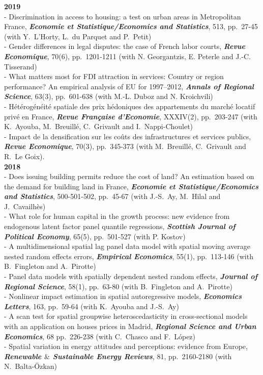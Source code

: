 \documentclass[a4paper,12pt]{article}
\begin{document}
\noindent \textbf{2019}  \smallskip \\ 
- Discrimination in access to housing: a test on urban areas in Metropolitan France, \textit{\textbf{Economie et Statistique/Economics and Statistics}}, 513, pp.~27-45 (with Y.~L'Horty, L.~du Parquet and P.~Petit) \\
- Gender differences in legal disputes: the case of French labor courts, \textit{\textbf{Revue Economique}}, 70(6), pp.~1201-1211 (with N. Georgantzis, E. Peterle and J.-C. Tisserand) \\
- What matters most for FDI attraction in services: Country or region performance? An empirical analysis of EU for 1997–2012, \textit{\textbf{Annals of Regional Science}}, 63(3), pp.~601-638 (with M.-L. Duboz and N. Kroichvili) \\ 	
- Hétérogénéité spatiale des prix hédoniques des appartements du marché locatif privé en France, \textit{\textbf{Revue Française d'Economie}}, XXXIV(2), pp.~203-247 (with K.~Ayouba, M.~Breuillé, C.~Grivault and I.~Nappi-Choulet) \\
- Impact de la densification sur les coûts des infrastructures et services publics, \textit{\textbf{Revue Economique}}, 70(3), pp.~345-373 (with M.~Breuillé, C.~Grivault and R.~Le Goix). \\

\noindent \textbf{2018}  \smallskip \\ 
- Does issuing building permits reduce the cost of land? An estimation based on the demand for building land in France, \textit{\textbf{Economie et Statistique/Economics and Statistics}}, 500-501-502, pp.~45-67 (with J.-S.~Ay, M.~Hilal and J.~Cavailhès)\\
- What role for human capital in the growth process: new evidence from endogenous latent factor panel quantile regressions, \textit{\textbf{Scottish Journal of Political Economy}}, 65(5), pp.~501-527 (with P. Kostov) \\
- A multidimensional spatial lag panel data model with spatial moving average nested random effects errors, \textit{\textbf{Empirical Economics}}, 55(1), pp.~113-146 (with B.~Fingleton and A.~Pirotte) \\
- Panel data models with spatially dependent nested random effects, \textit{\textbf{Journal of Regional Science}}, 58(1), pp.~63-80 (with B.~Fingleton and A.~Pirotte) \\
- Nonlinear impact estimation in spatial autoregressive models, \textit{\textbf{Economics Letters}}, 163, pp.~59-64 (with K.~Ayouba and J.-S.~Ay) \\
- A scan test for spatial groupwise heteroscedasticity in cross-sectional models with an application on houses prices in Madrid, \textit{\textbf{Regional Science and Urban Economics}}, 68 pp.~226-238 (with C.~Chasco and F.~López)\\
- Spatial variation in energy attitudes and perceptions: evidence from Europe, \textit{\textbf{Renewable $\&$ Sustainable Energy Reviews}}, 81, pp.~2160-2180 (with N.~Balta-Özkan) \\
		
\end{document}
